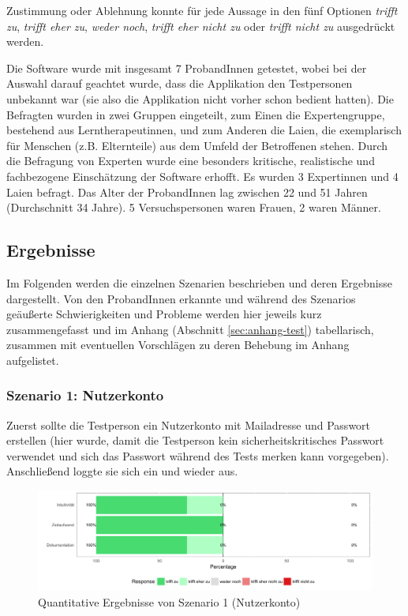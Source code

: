 Zustimmung oder Ablehnung konnte für jede Aussage in den fünf Optionen \textit{trifft zu}, \textit{trifft eher zu}, \textit{weder noch}, \textit{trifft eher nicht zu} oder \textit{trifft nicht zu} ausgedrückt werden.

Die Software wurde mit insgesamt 7 ProbandInnen getestet, wobei bei der Auswahl darauf geachtet wurde, dass die  Applikation den Testpersonen unbekannt war (sie also die Applikation nicht vorher schon bedient hatten). Die Befragten wurden in zwei Gruppen eingeteilt, zum Einen die Expertengruppe, bestehend aus Lerntherapeutinnen, und zum Anderen die Laien, die exemplarisch für Menschen (z.B. Elternteile) aus dem Umfeld der Betroffenen stehen. Durch die Befragung von Experten wurde eine besonders kritische, realistische und fachbezogene Einschätzung der Software erhofft. Es wurden 3 Expertinnen und 4 Laien befragt. Das Alter der ProbandInnen lag zwischen 22 und 51 Jahren (Durchschnitt 34 Jahre). 5 Versuchspersonen waren Frauen, 2 waren Männer.\\

\subsection{Ergebnisse}

Im Folgenden werden die einzelnen Szenarien beschrieben und deren Ergebnisse dargestellt. Von den ProbandInnen erkannte und während des Szenarios geäußerte Schwierigkeiten und Probleme werden hier jeweils kurz zusammengefasst und im Anhang (Abschnitt \ref{sec:anhang-test}) tabellarisch, zusammen mit eventuellen Vorschlägen zu deren Behebung im Anhang aufgelistet.

\subsubsection{Szenario 1: Nutzerkonto}

Zuerst sollte die Testperson ein Nutzerkonto mit Mailadresse und Passwort erstellen (hier wurde, damit die Testperson kein sicherheitskritisches Passwort verwendet und sich das Passwort während des Tests merken kann  vorgegeben). Anschließend loggte sie sich ein und wieder aus.

\begin{figure}[h!]
	\centering
	\includegraphics[width=.8\linewidth]{figures/evaluation/scenario1}
	\caption{Quantitative Ergebnisse von Szenario 1 (Nutzerkonto)}
	\label{fig:evaluation-sc1}
\end{figure}

